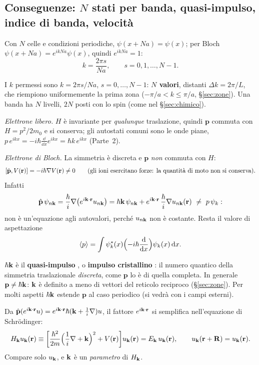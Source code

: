 \documentclass[11pt,a4paper]{article}
\begin{document}
\subsection{Conseguenze: $N$ stati per banda, quasi-impulso, indice di banda, velocità}\label{sec:quasiimpulso}\label{sec:indice}
Con $N$ celle e condizioni periodiche, $\psi(x+Na)=\psi(x)$; per Bloch $\psi(x+Na)=e^{ikNa}\psi(x)$, quindi $e^{ikNa}=1$:
\[
k=\frac{2\pi s}{Na},\qquad s=0,1,\dots,N-1 .
\]
\begin{chiave}
I $k$ permessi sono $k=2\pi s/Na$, $s=0,\dots,N-1$: \textbf{$N$ valori}, distanti $\Delta k=2\pi/L$, che riempiono uniformemente la prima zona
($-\pi/a<k\le\pi/a$, §\ref{sec:zone}). Una banda ha $N$ livelli, $2N$ posti con lo spin (come nel §\ref{sec:chimico}).
\end{chiave}

\emph{Elettrone libero.} $H$ è invariante per \emph{qualunque} traslazione, quindi $\mathbf p$ commuta con $H=p^2/2m_0$ e si conserva; gli autostati
comuni sono le onde piane, $p\,e^{ikx}=-i\hbar\frac{\dd}{\dd x}e^{ikx}=\hbar k\,e^{ikx}$ (Parte~2).

\emph{Elettrone di Bloch.} La simmetria è discreta e $\mathbf p$ \emph{non} commuta con $H$:
\[
[\hat{\mathbf p},V(\mathbf r)]=-i\hbar\nabla V(\mathbf r)\neq0 \qquad(\text{gli ioni esercitano forze: la quantità di moto non si conserva}).
\]
Infatti
\[
\hat{\mathbf p}\,\psi_{n\mathbf k}=\frac\hbar i\nabla\bigl(e^{i\mathbf k\cdot\mathbf r}u_{n\mathbf k}\bigr)=\hbar\mathbf k\,\psi_{n\mathbf k}+e^{i\mathbf k\cdot\mathbf r}\,\frac\hbar i\nabla u_{n\mathbf k}(\mathbf r)\ \neq\ p\,\psi_k:
\]
non è un'equazione agli autovalori, perché $u_{n\mathbf k}$ non è costante. Resta il valore di aspettazione
\[
\langle p\rangle=\int\psi_k^*(x)\Bigl(-i\hbar\frac{\mathrm d}{\mathrm d x}\Bigr)\psi_k(x)\,\mathrm d x .
\]
\begin{definizione}
$\hbar\mathbf k$ è il \textbf{quasi-impulso} , o \textbf{impulso cristallino} : il numero quantico della simmetria
traslazionale \emph{discreta}, come $\mathbf p$ lo è di quella completa. In generale $\mathbf p\ne\hbar\mathbf k$: $\mathbf k$ è definito a meno di vettori del reticolo
reciproco (§\ref{sec:zone}). Per molti aspetti $\hbar\mathbf k$ estende $\mathbf p$ al caso periodico (si vedrà con i campi esterni).
\end{definizione}

Da $\hat{\mathbf p}(e^{i\mathbf k\cdot\mathbf r}u)=e^{i\mathbf k\cdot\mathbf r}\hbar(\mathbf k+\tfrac1i\nabla)u$, il fattore $e^{i\mathbf k\cdot\mathbf r}$ si semplifica nell'equazione di Schrödinger:
\[
H_{\mathbf k}u_{\mathbf k}(\mathbf r)\equiv\biggl[\frac{\hbar^2}{2m}\Bigl(\frac1i\nabla+\mathbf k\Bigr)^2+V(\mathbf r)\biggr]u_{\mathbf k}(\mathbf r)=E_{\mathbf k}\,u_{\mathbf k}(\mathbf r),\qquad u_{\mathbf k}(\mathbf r+\mathbf R)=u_{\mathbf k}(\mathbf r).
\]
Compare solo $u_{\mathbf k}$, e $\mathbf k$ è un \emph{parametro} di $H_{\mathbf k}$.
\end{document}
